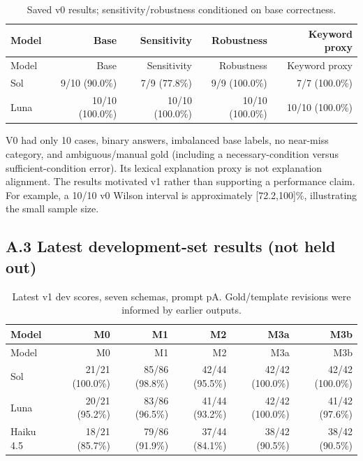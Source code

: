\documentclass[11pt,a4paper]{article}
\begin{document}
\begingroup\small\setlength{\tabcolsep}{4pt}
\begin{longtable}{lrrrr}
\caption{Saved v0 results; sensitivity/robustness conditioned on base correctness.}\\
\toprule
Model & Base & Sensitivity & Robustness & Keyword proxy \\
\midrule\endfirsthead
\toprule
Model & Base & Sensitivity & Robustness & Keyword proxy \\
\midrule\endhead
\bottomrule\endfoot
Sol & 9/10 (90.0\%) & 7/9 (77.8\%) & 9/9 (100.0\%) & 7/7 (100.0\%) \\
Luna & 10/10 (100.0\%) & 10/10 (100.0\%) & 10/10 (100.0\%) & 10/10 (100.0\%) \\
\end{longtable}\endgroup


V0 had only 10 cases, binary answers, imbalanced base labels, no near-miss category, and ambiguous/manual gold (including a necessary-condition versus sufficient-condition error). Its lexical explanation proxy is not explanation alignment. The results motivated v1 rather than supporting a performance claim. For example, a 10/10 v0 Wilson interval is approximately [72.2,100]\%, illustrating the small sample size.

\subsection*{A.3 Latest development-set results (not held out)}

\begingroup\small\setlength{\tabcolsep}{4pt}
\begin{longtable}{lrrrrr}
\caption{Latest v1 dev scores, seven schemas, prompt pA. Gold/template revisions were informed by earlier outputs.}\\
\toprule
Model & M0 & M1 & M2 & M3a & M3b \\
\midrule\endfirsthead
\toprule
Model & M0 & M1 & M2 & M3a & M3b \\
\midrule\endhead
\bottomrule\endfoot
Sol & 21/21 (100.0\%) & 85/86 (98.8\%) & 42/44 (95.5\%) & 42/42 (100.0\%) & 42/42 (100.0\%) \\
Luna & 20/21 (95.2\%) & 83/86 (96.5\%) & 41/44 (93.2\%) & 42/42 (100.0\%) & 41/42 (97.6\%) \\
Haiku 4.5 & 18/21 (85.7\%) & 79/86 (91.9\%) & 37/44 (84.1\%) & 38/42 (90.5\%) & 38/42 (90.5\%) \\
\end{longtable}\endgroup
\end{document}
